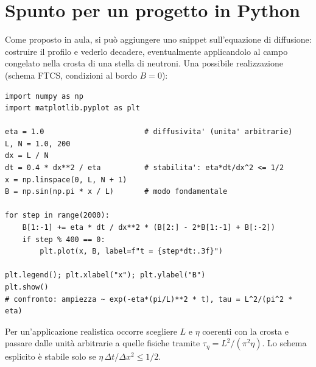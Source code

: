 \section{Spunto per un progetto in Python}
Come proposto in aula, si può aggiungere uno snippet sull'equazione di diffusione: costruire il profilo e vederlo decadere, eventualmente applicandolo al campo congelato nella crosta di una stella di neutroni. Una possibile realizzazione (schema FTCS, condizioni al bordo $B=0$):
\begin{verbatim}
import numpy as np
import matplotlib.pyplot as plt

eta = 1.0                       # diffusivita' (unita' arbitrarie)
L, N = 1.0, 200
dx = L / N
dt = 0.4 * dx**2 / eta          # stabilita': eta*dt/dx^2 <= 1/2
x = np.linspace(0, L, N + 1)
B = np.sin(np.pi * x / L)       # modo fondamentale

for step in range(2000):
    B[1:-1] += eta * dt / dx**2 * (B[2:] - 2*B[1:-1] + B[:-2])
    if step % 400 == 0:
        plt.plot(x, B, label=f"t = {step*dt:.3f}")

plt.legend(); plt.xlabel("x"); plt.ylabel("B")
plt.show()
# confronto: ampiezza ~ exp(-eta*(pi/L)**2 * t), tau = L^2/(pi^2 * eta)
\end{verbatim}
Per un'applicazione realistica occorre scegliere $L$ e $\eta$ coerenti con la crosta e passare dalle unità arbitrarie a quelle fisiche tramite $\tau_\eta=L^2/(\pi^2\eta)$. Lo schema esplicito è stabile solo se $\eta\,\Delta t/\Delta x^2\le1/2$.
